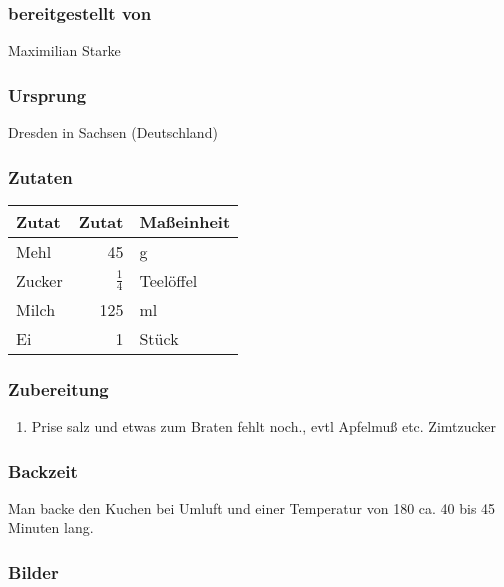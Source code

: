 \documentclass[a4paper]{book}
\begin{document}
\subsubsection{bereitgestellt von}
Maximilian Starke
\subsubsection{Ursprung}
Dresden in Sachsen (Deutschland)
\subsubsection{Zutaten}
\begin{center}
	\begin{tabular}{|l|rl|}
		\hline
		\textbf{Zutat} & \textbf{Zutat} & \textbf{Maßeinheit} \\
		\hline
		Mehl & 45 & g \\
		Zucker & $\frac{1}{4}$ & Teelöffel \\
		\hline
		Milch & 125 & ml \\
		Ei & 1 & Stück \\
		\hline
	\end{tabular}
\end{center}
\subsubsection{Zubereitung}
\begin{enumerate}[(1)]
	\item Prise salz und etwas zum Braten fehlt noch., evtl Apfelmuß etc. Zimtzucker 
\end{enumerate}
\subsubsection{Backzeit}
Man backe den Kuchen bei Umluft und einer Temperatur von 180{\textcelsius} ca. 40 bis 45 Minuten lang.
\subsubsection{Bilder}
\end{document}
